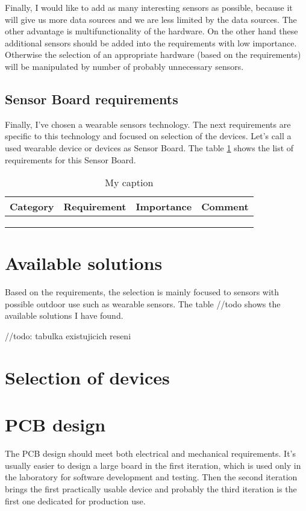 \documentclass[12pt,a4paper]{article}
\begin{document}
Finally, I would like to add as many interesting sensors as possible, because it will give us more data sources and we are less limited by the data sources. The other advantage is multifunctionality of the hardware. On the other hand these additional sensors should be added into the requirements with low importance. Otherwise the selection of an appropriate hardware (based on the requirements) will be manipulated by number of probably unnecessary sensors.

\subsection{Sensor Board requirements}
Finally, I've chosen a wearable sensors technology. The next requirements are specific to this technology and focused on selection of the devices. Let's call a used wearable device or devices as Sensor Board. The table \ref{HWrequirements} shows the list of requirements for this Sensor Board.

\begin{table}[]
\centering
\caption{My caption}
\label{HWrequirements}
\begin{tabular}{|l|l|l|l|}
\hline
Category & Requirement & Importance & Comment \\ \hline
         &             &            &         \\ \hline
         &             &            &         \\ \hline
         &             &            &         \\ \hline
\end{tabular}
\end{table}

\section{Available solutions}
Based on the requirements, the selection is mainly focused to sensors with possible outdoor use such as wearable sensors. The table //todo shows the available solutions I have found.

//todo: tabulka existujicich reseni

\section{Selection of devices}

\section{PCB design}
The PCB design should meet both electrical and mechanical requirements. It's usually easier to design a large board in the first iteration, which is used only in the laboratory for software development and testing. Then the second iteration brings the first practically usable device and probably the third iteration is the first one dedicated for production use.
\end{document}
